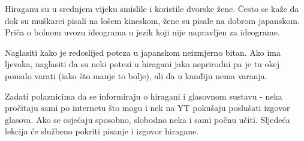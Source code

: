 	\vspace{10pt}
	Hiraganu su u srednjem vijeku smislile i koristile dvorske žene. Često se kaže da dok su muškarci pisali na lošem kineskom, žene su pisale na dobrom japanskom. Priča o bolnom uvozu ideograma u jezik koji nije napravljen za ideograme.
	
	\vspace{10pt}
	Naglasiti kako je redoslijed poteza u japanskom neizmjerno bitan. Ako ima ljevaka, naglasiti da su neki potezi u hiragani jako neprirodni pa je tu okej pomalo varati (iako što manje to bolje), ali da u kanđiju nema varanja.
	
	
	Zadati polaznicima da se informiraju o hiragani i glasovnom sustavu - neka pročitaju sami po internetu što mogu i nek na YT pokušaju poslušati izgovor glasova. Ako se osjećaju sposobno, slobodno neka i sami počnu učiti. Sljedeća lekcija će službeno pokriti pisanje i izgovor hiragane.
